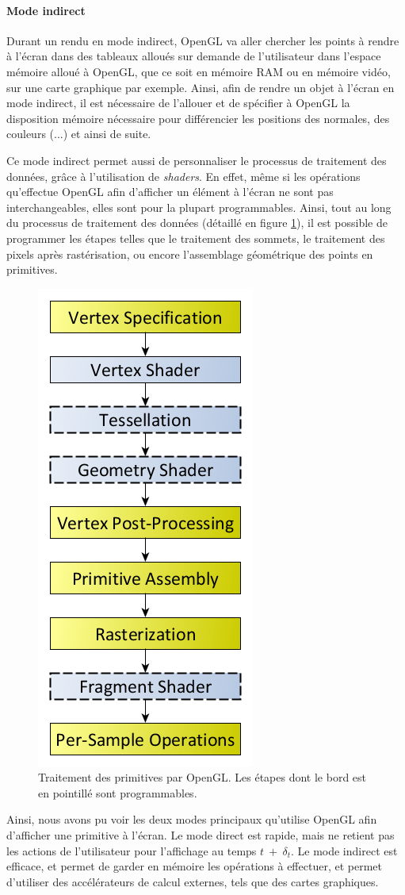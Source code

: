 {    \paragraph{Mode indirect}
    {
        Durant un rendu en mode indirect, OpenGL va aller chercher les points à rendre à l'écran dans des tableaux alloués sur demande de l'utilisateur dans l'espace mémoire alloué à OpenGL, que ce soit en mémoire RAM ou en mémoire vidéo, sur une carte graphique par exemple. Ainsi, afin de rendre un objet à l'écran en mode indirect, il est nécessaire de l'allouer et de spécifier à OpenGL la disposition mémoire nécessaire pour différencier les positions des normales, des couleurs (...) et ainsi de suite.

        Ce mode indirect permet aussi de personnaliser le processus de traitement des données, grâce à l'utilisation de \textit{shaders}. En effet, même si les opérations qu'effectue OpenGL afin d'afficher un élément à l'écran ne sont pas interchangeables, elles sont pour la plupart programmables. Ainsi, tout au long du processus de traitement des données (détaillé en figure \ref{img:opengl:rendering_pipeline}), il est possible de programmer les étapes telles que le traitement des sommets, le traitement des pixels après rastérisation, ou encore l'assemblage géométrique des points en primitives.

        \begin{figure}[h]
            \centering
            \includegraphics[width=.2\linewidth]{img/RenderingPipeline.png}
            \caption{Traitement des primitives par OpenGL. Les étapes dont le bord est en pointillé sont programmables.}
            \label{img:opengl:rendering_pipeline}
        \end{figure}
    }

    Ainsi, nous avons pu voir les deux modes principaux qu'utilise OpenGL afin d'afficher une primitive à l'écran. Le mode direct est rapide, mais ne retient pas les actions de l'utilisateur pour l'affichage au temps $t~+~\delta_t$. Le mode indirect est efficace, et permet de garder en mémoire les opérations à effectuer, et permet d'utiliser des accélérateurs de calcul externes, tels que des cartes graphiques.
}